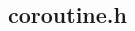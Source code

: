 \documentclass[12pt]{article}
\begin{document}
\begin{CJK}{UTF8}{bsmi}
\appendix
\appendixpage
\section{coroutine.h}\label{ref_coroutine_h}

%

%

\end{CJK}
\end{document}
